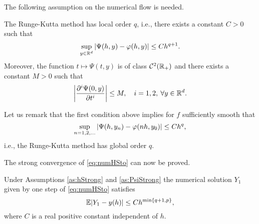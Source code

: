 \documentclass{scrartcl}
\begin{document}
\noindent The following assumption on the numerical flow is needed.
\begin{assumption}\label{as:PsiStrong} The Runge-Kutta method has local order $q$, i.e., there exists a constant $C > 0$ such that
	\begin{equation}
	\sup_{y\in\mathbb{R}^d} \abs{\Psi(h, y) - \varphi(h, y)} \leq Ch^{q+1}.
	\end{equation}
	Moreover, the function $t \mapsto \Psi(t, y)$ is of class $\mathcal{C}^2(\mathbb{R}_+)$ and there exists a constant $M > 0$ such that 
	\begin{equation}
	\abs{\pdv[i]{\Psi(0, y)}{t}} \leq M, \quad i = 1, 2, \: \forall y \in \mathbb{R}^d.
	\end{equation} 
\end{assumption}
\begin{remark} Let us remark that the first condition above implies for $f$ sufficiently smooth that
	\begin{equation}
		\sup_{n = 1, 2, \ldots} \abs{\Psi(h, y_n) - \varphi(nh, y_0)} \leq Ch^{q},
	\end{equation}
	i.e., the Runge-Kutta method has global order $q$.
\end{remark}
\noindent The strong convergence of \eqref{eq:numHSto} can now be proved. 
\begin{theorem} Under Assumptions \ref{as:hStrong} and \ref{as:PsiStrong} the numerical solution $Y_1$ given by one step of \eqref{eq:numHSto} satisfies 
	\begin{equation}
	\mathbb{E}\abs{Y_1 - y(h)} \leq C h^{\min\{q + 1, p\}},
	\end{equation}
	where $C$ is a real positive constant independent of $h$.
\end{theorem}
\end{document}
